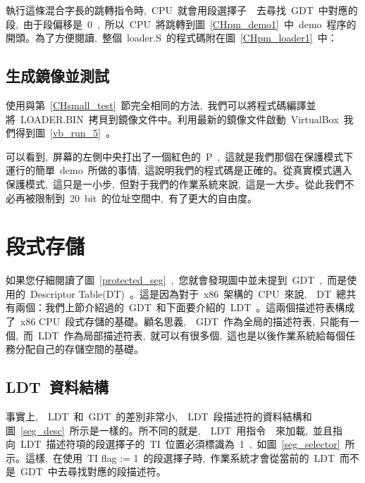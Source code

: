 執行這條混合字長的跳轉指令時,~CPU~就會用段選擇子~~去尋找~GDT~中對應的段,~由于段偏移是~0~,~所以~CPU~將跳轉到圖~\ref{CHpm_demo1}~中~demo~程序的開頭。為了方便閱讀,~整個~loader.S~的程式碼附在圖~\ref{CHpm_loader1}~中：

\label{CHpm_loader1}

\subsection{生成鏡像並測試}

使用與第~\ref{CHsmall_test}~節完全相同的方法,~我們可以將程式碼編譯並將~LOADER.BIN~拷貝到鏡像文件中。利用最新的鏡像文件啟動~VirtualBox~我們得到圖~\ref{vb_run_5}~。

可以看到,~屏幕的左側中央打出了一個紅色的~P~,~這就是我們那個在保護模式下運行的簡單~demo~所做的事情,~這說明我們的程式碼是正確的。從真實模式邁入保護模式,~這只是一小步,~但對于我們的作業系統來說,~這是一大步。從此我們不必再被限制到~20~bit~的位址空間中,~有了更大的自由度。


\section{段式存儲}

如果您仔細閱讀了圖~\ref{protected_seg}~,~您就會發現圖中並未提到~GDT~,~而是使用的~Descriptor Table(DT)~。這是因為對于~x86~架構的~CPU~來說,~~DT~總共有兩個：我們上節介紹過的~GDT~和下面要介紹的~LDT~。這兩個描述符表構成了~x86 CPU~段式存儲的基礎。顧名思義,~~GDT~作為全局的描述符表,~只能有一個,~而~LDT~作為局部描述符表,~就可以有很多個,~這也是以後作業系統給每個任務分配自己的存儲空間的基礎。

\subsection{LDT~資料結構} \label{CHpm_ldt}


事實上,~~LDT~和~GDT~的差別非常小,~~LDT~段描述符的資料結構和圖~\ref{seg_desc}~所示是一樣的。所不同的就是,~~LDT~用指令~~來加載,~並且指向~LDT~描述符項的段選擇子的~TI~位置必須標識為~1~,~如圖~\ref{seg_selector}~所示。這樣,~在使用~TI flag := 1~的段選擇子時,~作業系統才會從當前的~LDT~而不是~GDT~中去尋找對應的段描述符。

